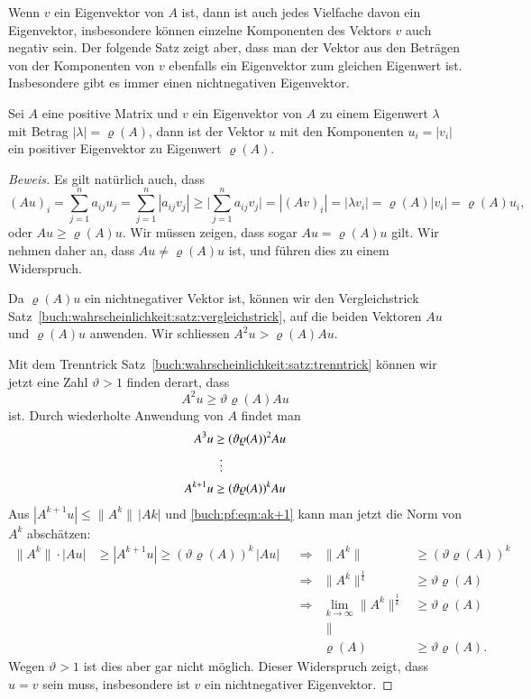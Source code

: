 Wenn $v$ ein Eigenvektor von $A$ ist, dann ist auch jedes Vielfache
davon ein Eigenvektor, insbesondere können einzelne Komponenten
des Vektors $v$ auch negativ sein.
Der folgende Satz zeigt aber, dass man der Vektor aus den Beträgen
von der Komponenten von $v$ ebenfalls ein Eigenvektor zum 
gleichen Eigenwert ist.
Insbesondere gibt es immer einen nichtnegativen Eigenvektor.

\begin{satz}
\label{buch:wahrscheinlichkeit:satz:positivereigenvektor}
Sei $A$ eine positive Matrix und $v$ ein Eigenvektor von $A$ zu einem
Eigenwert $\lambda$ mit Betrag $|\lambda|=\varrho(A)$,
dann ist der Vektor $u$  mit den Komponenten $u_i=|v_i|$ ein
positiver Eigenvektor zu Eigenwert $\varrho(A)$.
\end{satz}

\begin{proof}[Beweis]
Es gilt natürlich auch, dass
\[
(Au)_i
=
\sum_{j=1}^n a_{i\!j}u_j
=
\sum_{j=1}^n |a_{i\!j}v_j|
\ge
\biggl|
\sum_{j=1}^n a_{i\!j}v_j
\biggr|
=
|(Av)_i|
=
|\lambda v_i|
=
\varrho(A) |v_i|
=
\varrho(A) u_i,
\]
oder $Au \ge \varrho(A)u$.
Wir müssen zeigen, dass sogar $Au=\varrho(A)u$ gilt.
Wir nehmen daher an, dass $Au\ne \varrho(A)u$ ist, und führen dies zu
einem Widerspruch.

Da $\varrho(A)u$ ein nichtnegativer Vektor ist, können wir den Vergleichstrick
Satz~\ref{buch:wahrscheinlichkeit:satz:vergleichstrick}, auf die beiden
Vektoren $Au$ und $\varrho(A)u$ anwenden.
Wir schliessen $A^2u > \varrho(A)Au$.

Mit dem Trenntrick
Satz~\ref{buch:wahrscheinlichkeit:satz:trenntrick}
können wir jetzt eine Zahl $\vartheta>1$ finden derart, dass
\[
A^2 u \ge \vartheta \varrho(A) Au
\]
ist.
Durch wiederholte Anwendung von $A$ findet man
\begin{align}
A^3 u & \ge (\vartheta \varrho(A))^2 Au
\notag
\\
&\phantom{0}\vdots
\notag
\\
A^{k+1} u & \ge (\vartheta \varrho(A))^{k} Au
\label{buch:pf:eqn:ak+1}
\end{align}
Aus $|A^{k+1}u| \le \|A^k\|\,|Ak|$ und
\eqref{buch:pf:eqn:ak+1} kann man jetzt die Norm von $A^k$ abschätzen:
\[
\begin{aligned}
\| A^{k}\|\cdot |Au|
&\ge 
| A^{k+1}u|
\ge
(\vartheta\varrho(A))^{k}\, |Au|
&&
\Rightarrow
&
\|A^k\| &\ge  (\vartheta\varrho(A))^k 
\\
&&&\Rightarrow&
\|A^k\|^{\frac{1}{k}} &\ge \vartheta\varrho(A)
\\
&&&\Rightarrow&
\lim_{k\to\infty}
\|A^k\|^{\frac{1}{k}} &\ge \vartheta\varrho(A)
\\
&&&&\|\phantom{00}&
\\
&&&%
&
\varrho(A)&\ge \vartheta\varrho(A).
\end{aligned}
\]
Wegen $\vartheta>1$ ist dies aber gar nicht möglich.
Dieser Widerspruch zeigt, dass $u=v$ sein muss, insbesondere ist
$v$ ein nichtnegativer Eigenvektor.
\end{proof}

